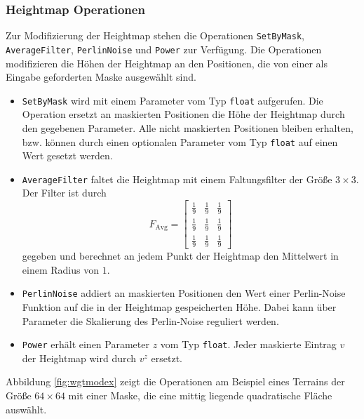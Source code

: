 \subsubsection{Heightmap Operationen}\label{sec:heightopt}
Zur Modifizierung der Heightmap stehen die Operationen \texttt{SetByMask}, \texttt{AverageFilter}, \texttt{PerlinNoise} und \texttt{Power} zur Verfügung. Die Operationen modifizieren die Höhen der Heightmap an den Positionen, die von einer als Eingabe geforderten Maske ausgewählt sind.
\begin{itemize}
    \item \texttt{SetByMask} wird mit einem Parameter vom Typ \texttt{float} aufgerufen. Die Operation ersetzt an maskierten Positionen die Höhe der Heightmap durch den gegebenen Parameter. Alle nicht maskierten Positionen bleiben erhalten, bzw. können durch einen optionalen Parameter vom Typ \texttt{float} auf einen Wert gesetzt werden.
    \item \texttt{AverageFilter} faltet die Heightmap mit einem Faltungsfilter der Größe $3\times 3$. Der Filter ist durch \begin{displaymath}
        F_{\text{Avg}}=\begin{bmatrix}
            \frac{1}{9}&\frac{1}{9}&\frac{1}{9}\\
            \frac{1}{9}&\frac{1}{9}&\frac{1}{9}\\
            \frac{1}{9}&\frac{1}{9}&\frac{1}{9}
        \end{bmatrix}
    \end{displaymath}
    gegeben und berechnet an jedem Punkt der Heightmap den Mittelwert in einem Radius von $1$.
    \item \texttt{PerlinNoise} addiert an maskierten Positionen den Wert einer Perlin-Noise Funktion auf die in der Heightmap gespeicherten Höhe. Dabei kann über Parameter die Skalierung des Perlin-Noise reguliert werden.
    \item \texttt{Power} erhält einen Parameter $z$ vom Typ \texttt{float}. Jeder maskierte Eintrag $v$ der Heightmap wird durch $v^z$ ersetzt.
\end{itemize}
Abbildung \ref{fig:wgtmodex} zeigt die Operationen am Beispiel eines Terrains der Größe $64\times 64$ mit einer Maske, die eine mittig liegende quadratische Fläche auswählt.

